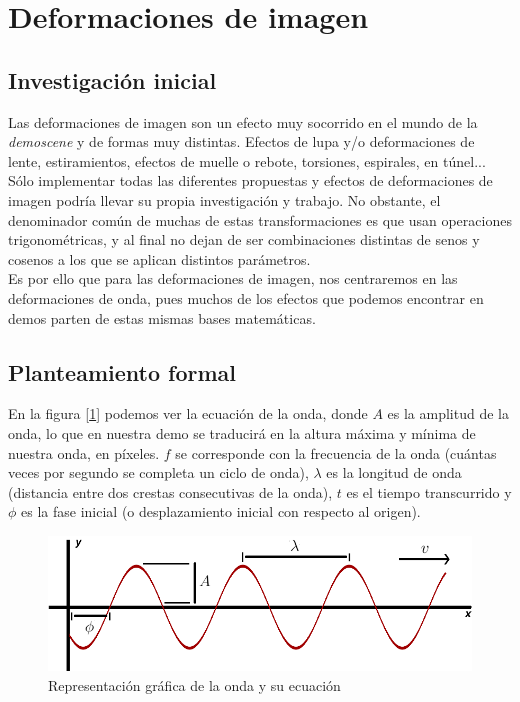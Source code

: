 \section{Deformaciones de imagen}

\subsection{Investigación inicial}

Las deformaciones de imagen son un efecto muy socorrido en el mundo de la \emph{demoscene} y de formas muy distintas. Efectos de lupa y/o deformaciones de lente, estiramientos, efectos de muelle o rebote, torsiones, espirales, en túnel...\\

Sólo implementar todas las diferentes propuestas y efectos de deformaciones de imagen podría llevar su propia investigación y trabajo. No obstante, el denominador común de muchas de estas transformaciones es que usan operaciones trigonométricas, y al final no dejan de ser combinaciones  distintas de senos y cosenos a los que se aplican distintos parámetros.\\

Es por ello que para las deformaciones de imagen, nos centraremos en las deformaciones de onda, pues muchos de los efectos que podemos encontrar en demos parten de estas mismas bases matemáticas.\\

\subsection{Planteamiento formal}

En la figura [\ref{fig:wavefunction}] podemos ver la ecuación de la onda, donde \(A\) es la amplitud de la onda, lo que en nuestra demo se traducirá en la altura máxima y mínima de nuestra onda, en píxeles. \(f\) se corresponde con la frecuencia de la onda (cuántas veces por segundo se completa un ciclo de onda), \(\lambda\) es la longitud de onda (distancia entre dos crestas consecutivas de la onda), \(t\) es el tiempo transcurrido y \(\phi\) es la fase inicial (o desplazamiento inicial con respecto al origen).\\

\begin{figure}[h]
	\centering
	\includegraphics[width=13cm]{archivos/wave}
	\caption{Representación gráfica de la onda y su ecuación}
	\label{fig:wavefunction}
\end{figure}


